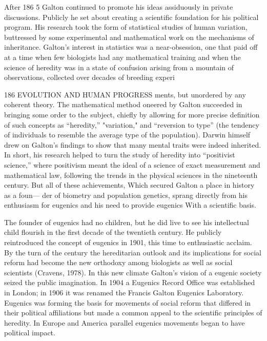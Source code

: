 \documentclass[12pt]{letter}
\begin{document}
After 186 5 Galton continued to promote his ideas assiduously in private discussions. Publicly he set about creating a scientific foundation for his political program. His research took the form of statistical studies of human variation, buttressed by some experimental and mathematical work on the mechanisms of inheritance. Galton’s interest in statistics was a near-obsession, one that paid off at a time when few biologists had any mathematical training and when the science of heredity was in a state of confusion arising from a mountain of observations, collected over decades of breeding experi~


186 EVOLUTION AND HUMAN PROGRESS
ments, but unordered by any coherent theory. The mathematical method oneered by Galton succeeded in bringing some order to the subject, chiefly by allowing for more precise definition of such concepts as “heredity,” "variation," and “reversion to type” (the tendency of individuals to resemble the average type of the population). Darwin himself drew on Galton’s findings to show that many mental traits were indeed inherited. In short, his research helped to turn the study of heredity into “positivist science,” where positivism meant the ideal of a science of exact measurement and mathematical law, following the trends in the physical sciences in the nineteenth century. But all of these achievements, Which secured Galton a place in history as a foun— der of biometry and population genetics, sprang directly from his enthusiasm for eugenics and his need to provide eugenics With a scientific basis.

The founder of eugenics had no children, but he did live to see his intellectual child flourish in the first decade of the twentieth century. He publicly reintroduced the concept of eugenics in 1901, this time to enthusiastic acclaim. By the turn of the century the hereditarian outlook and its implications for social reform had become the new orthodoxy among biologists as well as social scientists (Cravens, 1978). In this new climate Galton’s vision of a eugenic society seized the public imagination. In 1904 a Eugenics Record Office was established in London; in 1906 it was renamed the Francis Galton Eugenics Laboratory. Eugenics was forming the basis for movements of social reform that differed in their political affiliations but made a common appeal to the scientific principles of heredity. In Europe and America parallel eugenics movements began to have political impact.
\end{document}
